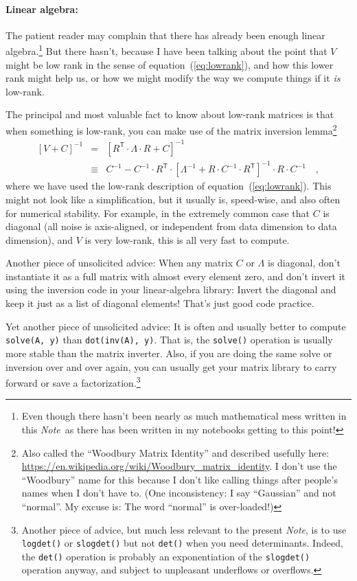 \documentclass[12pt,letterpaper]{article}
\newcommand{\code}[1]{{\texttt{#1}}}
\newcommand{\documentname}{\textsl{Note}}
\newcommand{\equationname}{equation}
\newcommand{\tra}[1]{{#1}^{\mathsf{T}}}
\newcommand{\inv}[1]{{#1}^{-1}}
\begin{document}
\paragraph{Linear algebra:}
The patient reader may complain that there has already been enough
linear algebra.\footnote{Even though there hasn't been nearly as much
  mathematical mess written in this \documentname\ as there has been written
  in my notebooks getting to this point!}  But there hasn't, because I
have been talking about the point that $V$ might be low rank in the
sense of \equationname~(\ref{eq:lowrank}), and how this lower rank
might help us, or how we might modify the way we compute things if it
\emph{is} low-rank.

The principal and most valuable fact to know about low-rank matrices
is that when something is low-rank, you can make use of the matrix
inversion lemma\footnote{Also called the ``Woodbury Matrix Identity''
  and described usefully here:
  \url{https://en.wikipedia.org/wiki/Woodbury_matrix_identity}. I
  don't use the ``Woodbury'' name for this because I don't like
  calling things after people's names when I don't have to. (One inconsistency:
  I say ``Gaussian'' and not ``normal''. My excuse is: The word ``normal'' is over-loaded!)}
\begin{eqnarray}
\inv{[V + C]} &=& \inv{[\tra{R}\cdot\Lambda\cdot R + C]}
\\
 &\equiv& \inv{C} - \inv{C}\cdot\tra{R}\cdot \inv{[\inv{\Lambda} + R\cdot \inv{C}\cdot\tra{R}]}\cdot R\cdot\inv{C}
\quad ,
\end{eqnarray}
where we have used the low-rank description of \equationname~(\ref{eq:lowrank}).
This might not look like a simplification, but it usually is, speed-wise, and
also often for numerical stability.
For example, in the extremely common case that $C$ is diagonal (all
noise is axis-aligned, or independent from data dimension to data
dimension), and $V$ is very low-rank, this is all very fast to
compute.

Another piece of unsolicited advice: When any matrix $C$ or $\Lambda$
is diagonal, don't instantiate it as a full matrix with almost every
element zero, and don't invert it using the inversion code in your
linear-algebra library: Invert the diagonal and keep it just as a list
of diagonal elements! That's just good code practice.

Yet another piece of unsolicited advice: It is often and usually
better to compute \code{solve(A, y)} than \code{dot(inv(A), y)}. That
is, the \code{solve()} operation is usually more stable than the
matrix inverter.  Also, if you are doing the same solve or inversion
over and over again, you can usually get your matrix library to carry
forward or save a factorization.\footnote{Another piece of advice, but
  much less relevant to the present \documentname, is to use
  \code{logdet()} or \code{slogdet()} but not \code{det()} when you
  need determinants.  Indeed, the \code{det()} operation is probably
  an exponentiation of the \code{slogdet()} operation anyway, and
  subject to unpleasant underflows or overflows.}
\end{document}
